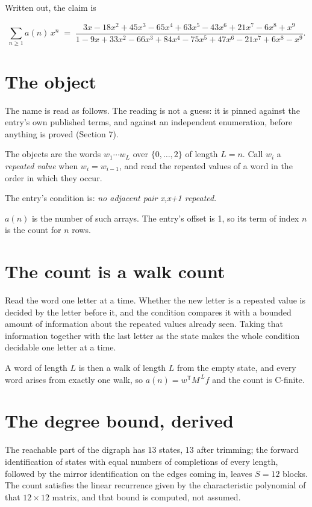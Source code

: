 \documentclass[11pt]{article}
\theoremstyle{definition}
\begin{document}
Written out, the claim is

\[\sum_{n \ge 1} a(n)\,x^n \;=\; \frac{3x - 18x^{2} + 45x^{3} - 65x^{4} + 63x^{5} - 43x^{6} + 21x^{7} - 6x^{8} + x^{9}}{1 - 9x + 33x^{2} - 66x^{3} + 84x^{4} - 75x^{5} + 47x^{6} - 21x^{7} + 6x^{8} - x^{9}}.\]

\section{The object}

The name is read as follows. The reading is not a guess: it is pinned against the entry's own published terms, and against an independent enumeration, before anything is proved (Section 7).

The objects are the words $w_1\cdots w_L$ over $\{0,\dots,2\}$ of length $L = n$. Call $w_i$ a {\itshape repeated value} when $w_i = w_{i-1}$, and read the repeated values of a word in the order in which they occur.

The entry's condition is: {\itshape no adjacent pair x,x+1 repeated}.

$a(n)$ is the number of such arrays. The entry's offset is 1, so its term of index $n$ is the count for $n$ rows.

\section{The count is a walk count}

Read the word one letter at a time. Whether the new letter is a repeated value is decided by the letter before it, and the condition compares it with a bounded amount of information about the repeated values already seen. Taking that information together with the last letter as the state makes the whole condition decidable one letter at a time.

A word of length $L$ is then a walk of length $L$ from the empty state, and every word arises from exactly one walk, so $a(n) = w^{\mathsf T}M^{\,L}f$ and the count is C-finite.

\section{The degree bound, derived}

The reachable part of the digraph has $13$ states, $13$ after trimming; the forward identification of states with equal numbers of completions of every length, followed by the mirror identification on the edges coming in, leaves $S = 12$ blocks. The count satisfies the linear recurrence given by the characteristic polynomial of that $12\times12$ matrix, and that bound is computed, not assumed.
\end{document}
